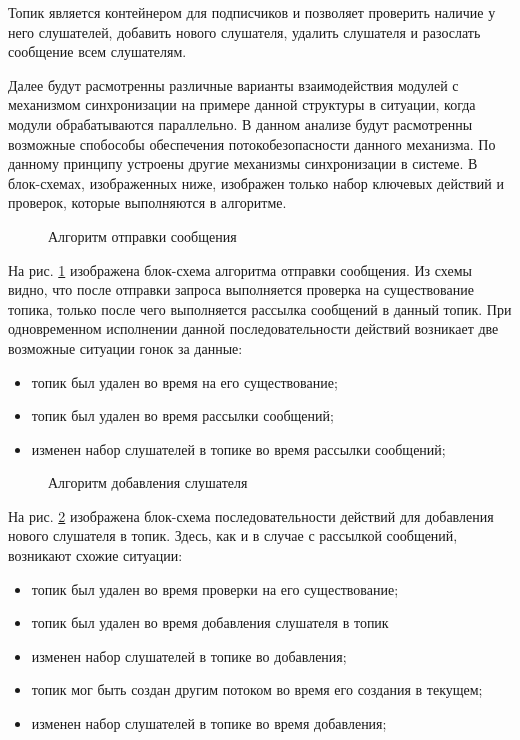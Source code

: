 Топик является контейнером для подписчиков и позволяет проверить наличие у него слушателей, добавить нового слушателя, удалить слушателя и разослать сообщение всем слушателям.

Далее будут расмотренны различные варианты взаимодействия модулей с механизмом синхронизации на примере данной структуры в ситуации, когда модули обрабатываются параллельно. В данном анализе будут расмотренны возможные спобособы обеспечения потокобезопасности данного механизма. По данному принципу устроены другие механизмы синхронизации в системе. В блок-схемах, изображенных ниже, изображен только набор ключевых действий и проверок, которые выполняются в алгоритме. 

\begin{figure}[h]
	\caption{Алгоритм отправки сообщения}
	\label{im:2_2_5_send_message}
\end{figure}

На рис. \ref{im:2_2_5_send_message} изображена блок-схема алгоритма отправки сообщения. Из схемы видно, что после отправки запроса выполняется проверка на существование топика, только после чего выполняется рассылка сообщений в данный топик. При одновременном исполнении данной последовательности  действий возникает две возможные ситуации гонок за данные:

\begin{itemize}  
	\item топик был удален во время на его существование;
	\item топик был удален во время рассылки сообщений;
	\item изменен набор слушателей в топике во время рассылки сообщений;
\end{itemize}

\begin{figure}[h]
	\caption{Алгоритм добавления слушателя}
	\label{im:2_2_4_add_listener}
\end{figure}


На рис. \ref{im:2_2_4_add_listener} изображена блок-схема последовательности действий для добавления нового слушателя в топик. Здесь, как и в случае с рассылкой сообщений, возникают схожие ситуации:

\begin{itemize}  
	\item топик был удален во время проверки на его существование;
	\item топик был удален во время добавления слушателя в топик
	\item изменен набор слушателей в топике во добавления;
	\item топик мог быть создан другим потоком во время его создания в текущем;
	\item изменен набор слушателей в топике во время добавления;
\end{itemize}

